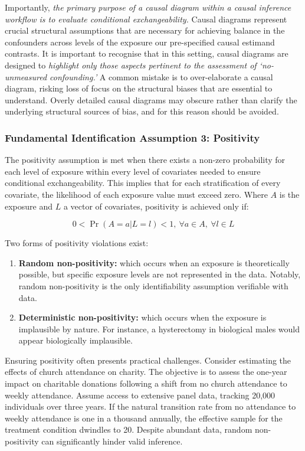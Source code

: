 \documentclass[
  singlecolumn,
  9pt]{article}
\begin{document}
Importantly, \emph{the primary purpose of a causal diagram within a
causal inference workflow is to evaluate conditional exchangeability.}
Causal diagrams represent crucial structural assumptions that are
necessary for achieving balance in the confounders across levels of the
exposure our pre-specified causal estimand contrasts. It is important to
recognise that in this setting, causal diagrams are designed to
\emph{highlight only those aspects pertinent to the assessment of
`no-unmeasured confounding.'} A common mistake is to over-elaborate a
causal diagram, risking loss of focus on the structural biases that are
essential to understand. Overly detailed causal diagrams may obscure
rather than clarify the underlying structural sources of bias, and for
this reason should be avoided.

\subsubsection{Fundamental Identification Assumption 3:
Positivity}\label{fundamental-identification-assumption-3-positivity}

The positivity assumption is met when there exists a non-zero
probability for each level of exposure within every level of covariates
needed to ensure conditional exchangeability. This implies that for each
stratification of every covariate, the likelihood of each exposure value
must exceed zero. Where \(A\) is the exposure and \(L\) a vector of
covariates, positivity is achieved only if:

\[
0 < \Pr(A = a | L = l) < 1, ~ \forall a \in A, ~ \forall l \in L
\]

Two forms of positivity violations exist:

\begin{enumerate}
\def\labelenumi{\arabic{enumi}.}
\item
  \textbf{Random non-positivity:} which occurs when an exposure is
  theoretically possible, but specific exposure levels are not
  represented in the data. Notably, random non-positivity is the only
  identifiability assumption verifiable with data.
\item
  \textbf{Deterministic non-positivity:} which occurs when the exposure
  is implausible by nature. For instance, a hysterectomy in biological
  males would appear biologically implausible.
\end{enumerate}

Ensuring positivity often presents practical challenges. Consider
estimating the effects of church attendance on charity. The objective is
to assess the one-year impact on charitable donations following a shift
from no church attendance to weekly attendance. Assume access to
extensive panel data, tracking 20,000 individuals over three years. If
the natural transition rate from no attendance to weekly attendance is
one in a thousand annually, the effective sample for the treatment
condition dwindles to 20. Despite abundant data, random non-positivity
can significantly hinder valid inference.
\end{document}
